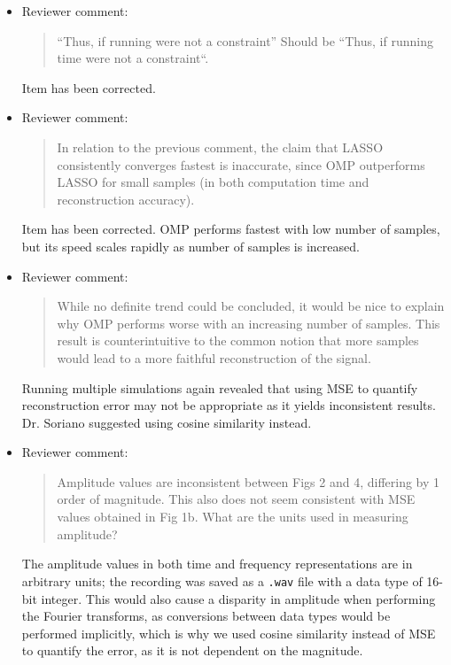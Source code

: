 \documentclass[10pt,a4paper,twoside]{article}
\begin{document}
\begin{itemize}
\item Reviewer comment:

\begin{quote}
	“Thus, if running were not a constraint” Should be “Thus, if running time were not a constraint“.
\end{quote}

Item has been corrected.

\item Reviewer comment:

\begin{quote}
	In relation to the previous comment, the claim that LASSO consistently converges fastest is inaccurate, since OMP outperforms LASSO for small samples (in both computation time and reconstruction accuracy).
\end{quote}

Item has been corrected. OMP performs fastest with low number of samples, but its speed scales rapidly as number of samples is increased.

\item Reviewer comment:

\begin{quote}
	While no definite trend could be concluded, it would be nice to explain why OMP performs worse with an increasing number of samples. This result is counterintuitive to the common notion that more samples would lead to a more faithful reconstruction of the signal.
\end{quote}

Running multiple simulations again revealed that using MSE to quantify reconstruction error may not be appropriate as it yields inconsistent results. Dr. Soriano suggested using cosine similarity instead.

\item Reviewer comment:

\begin{quote}
	Amplitude values are inconsistent between Figs 2 and 4, differing by 1 order of magnitude. This also does not seem consistent with MSE values obtained in Fig 1b. What are the units used in measuring amplitude?
\end{quote}

The amplitude values in both time and frequency representations are in arbitrary units; the recording was saved as a \texttt{.wav} file with a data type of 16-bit integer. This would also cause a disparity in amplitude when performing the Fourier transforms, as conversions between data types would be performed implicitly, which is why we used cosine similarity instead of MSE to quantify the error, as it is not dependent on the magnitude.


\end{itemize}
\end{document}
